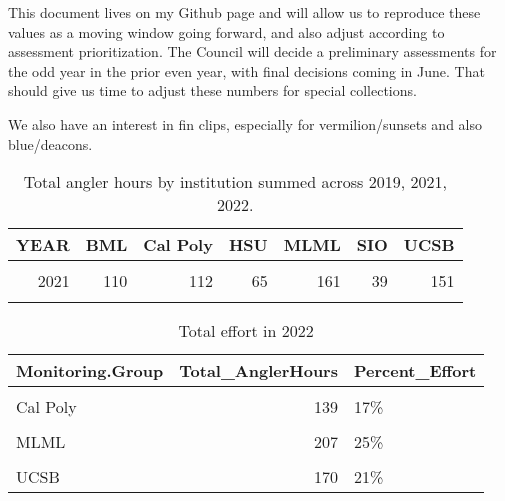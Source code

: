 \documentclass[
]{article}
\begin{document}
This document lives on my Github page and will allow us to reproduce these values
as a moving window going forward, and also adjust according to assessment
prioritization. The Council will decide a preliminary assessments for the odd year
in the prior even year, with final decisions coming in June. That should give us
time to adjust these numbers for special collections.

We also have an interest in fin clips, especially for vermilion/sunsets and also
blue/deacons.

\newpage

\begin{table}

\caption{\label{tab:anghrs}Total angler hours by institution summed across 2019, 2021, 2022.}
\centering
\begin{tabular}[t]{rrrrrrr}
\toprule
YEAR & BML & Cal Poly & HSU & MLML & SIO & UCSB\\
\midrule
\cellcolor{gray!6}{2019} & \cellcolor{gray!6}{193} & \cellcolor{gray!6}{172} & \cellcolor{gray!6}{66} & \cellcolor{gray!6}{187} & \cellcolor{gray!6}{97} & \cellcolor{gray!6}{110}\\
2021 & 110 & 112 & 65 & 161 & 39 & 151\\
\cellcolor{gray!6}{2022} & \cellcolor{gray!6}{97} & \cellcolor{gray!6}{139} & \cellcolor{gray!6}{71} & \cellcolor{gray!6}{207} & \cellcolor{gray!6}{143} & \cellcolor{gray!6}{170}\\
\bottomrule
\end{tabular}
\end{table}

\begin{table}

\caption{\label{tab:effort2022}Total effort in 2022}
\centering
\begin{tabular}[t]{lrl}
\toprule
Monitoring.Group & Total\_AnglerHours & Percent\_Effort\\
\midrule
\cellcolor{gray!6}{BML} & \cellcolor{gray!6}{97} & \cellcolor{gray!6}{12\%}\\
Cal Poly & 139 & 17\%\\
\cellcolor{gray!6}{HSU} & \cellcolor{gray!6}{71} & \cellcolor{gray!6}{9\%}\\
MLML & 207 & 25\%\\
\cellcolor{gray!6}{SIO} & \cellcolor{gray!6}{143} & \cellcolor{gray!6}{17\%}\\
\addlinespace
UCSB & 170 & 21\%\\
\bottomrule
\end{tabular}
\end{table}
\end{document}
